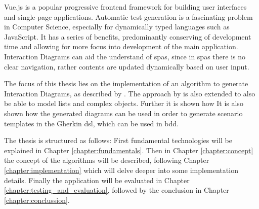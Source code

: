 Vue.js \parencite{vuejs_gh} is a popular progressive frontend framework for building user interfaces and single-page applications. Automatic test generation is a fascinating problem in Computer Science, especially for dynamically typed languages such as JavaScript. It has a series of benefits, predominantly conserving of development time and allowing for more focus into development of the main application. Interaction Diagrams can aid the understand of \glspl{spa}, since in \glspl{spa} there is no clear navigation, rather contents are updated dynamically based on user input. 

The focus of this thesis lies on the implementation of an algorithm to generate Interaction Diagrams, as described by \textcite{zhang2019scenario}. The approach by \textcite{zhang2019scenario} is also  extended to also be able to model lists and complex objects. Further it is shown how It is also shown how the generated diagrams can be used in order to generate scenario templates in the Gherkin \gls{dsl}, which can be used in \gls{bdd}.


The thesis is structured as follows:
First fundamental technologies will be explained in Chapter \ref{chapter:fundamentals}. Then in Chapter \ref{chapter:concept} the concept of the algorithms will be described, following Chapter \ref{chapter:implementation} which will delve deeper into some implementation details. Finally the application will be evaluated in Chapter \ref{chapter:testing_and_evaluation},
followed by the conclusion in Chapter \ref{chapter:conclussion}.